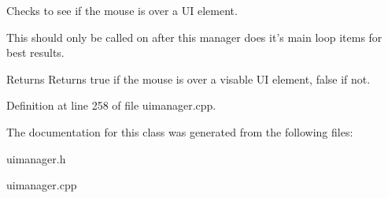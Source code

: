 Checks to see if the mouse is over a UI element. 

This should only be called on after this manager does it's main loop items for best results. \begin{DoxyReturn}{Returns}
Returns true if the mouse is over a visable UI element, false if not. 
\end{DoxyReturn}


Definition at line 258 of file uimanager.cpp.



The documentation for this class was generated from the following files:\begin{DoxyCompactItemize}
\item 
uimanager.h\item 
uimanager.cpp\end{DoxyCompactItemize}
